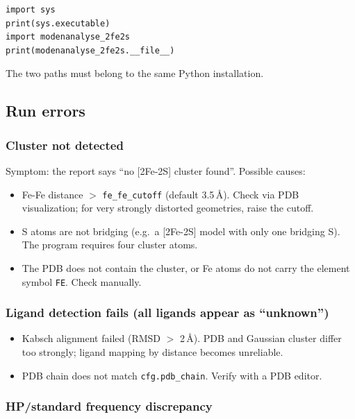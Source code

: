 \documentclass[11pt,a4paper,twoside]{article}
\theoremstyle{remark}
\begin{document}
\begin{lstlisting}[style=python]
import sys
print(sys.executable)
import modenanalyse_2fe2s
print(modenanalyse_2fe2s.__file__)
\end{lstlisting}

The two paths must belong to the same Python installation.

\subsection{Run errors}

\subsubsection*{Cluster not detected}

Symptom: the report says ``no [2Fe-2S] cluster found''. Possible
causes:

\begin{itemize}
  \item Fe-Fe distance $>$ \texttt{fe\_fe\_cutoff} (default
        3.5\,\AA{}). Check via PDB visualization; for very
        strongly distorted geometries, raise the cutoff.
  \item S atoms are not bridging (e.g.\ a [2Fe-2S] model with
        only one bridging S). The program requires four cluster
        atoms.
  \item The PDB does not contain the cluster, or Fe atoms do not
        carry the element symbol \texttt{FE}. Check manually.
\end{itemize}

\subsubsection*{Ligand detection fails (all ligands appear as ``unknown'')}

\begin{itemize}
  \item Kabsch alignment failed (RMSD $>$ 2\,\AA{}). PDB and
        Gaussian cluster differ too strongly; ligand mapping by
        distance becomes unreliable.
  \item PDB chain does not match \texttt{cfg.pdb\_chain}. Verify
        with a PDB editor.
\end{itemize}

\subsubsection*{HP/standard frequency discrepancy}
\end{document}
